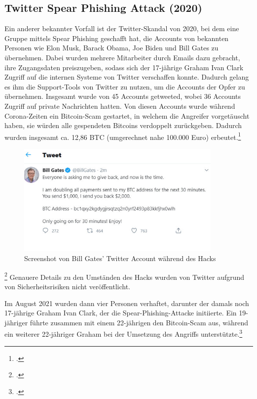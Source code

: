 \documentclass[12pt, a4paper, oneside]{scrartcl}
\begin{document}
\subsection{Twitter Spear Phishing Attack (2020)}

Ein anderer bekannter Vorfall ist der Twitter-Skandal von 2020, bei dem eine Gruppe mittels Spear Phishing geschafft
hat, die Accounts von bekannten Personen wie Elon Musk, Barack Obama, Joe Biden und Bill Gates zu übernehmen.
Dabei wurden mehrere Mitarbeiter durch Emails dazu gebracht, ihre Zugangsdaten preiszugeben, sodass sich 
der 17-jährige Graham Ivan Clark Zugriff auf die internen Systeme von Twitter verschaffen konnte. Dadurch gelang
es ihm die Support-Tools von Twitter zu nutzen, um die Accounts der Opfer zu übernehmen. Insgesamt wurde von 45 Accounts
getweeted, wobei 36 Accounts Zugriff auf private Nachrichten hatten. Von diesen Accounts wurde während Corona-Zeiten 
ein Bitcoin-Scam gestartet, in welchem die Angreifer vorgetäuscht haben, sie würden alle gespendeten Bitcoins verdoppelt
zurückgeben. Dadurch wurden insgesamt ca. 12,86 BTC (umgerechnet nahe 100.000 Euro) erbeutet.\footcite{teampw_TwitterPhishing}\\

\begin{figure}[h!]
  \centering
  \includegraphics[width=10cm]{bill_hack.png}
  \caption[Screenshot von Bill Gates' Twitter Account während des Hacks]{Screenshot von Bill Gates' Twitter Account während des Hacks\footnotemark}
\end{figure}
\footcitetext{PicTwitterHack}
Genauere Details zu den Umständen des Hacks wurden von Twitter aufgrund von Sicherheitsrisiken nicht veröffentlicht. 
\par
Im August 2021 wurden dann vier Personen verhaftet, darunter der damals noch 17-jährige Graham Ivan Clark, 
der die Spear-Phishing-Attacke initiierte. Ein 19-jähriger führte zusammen mit einem 22-jährigen den 
Bitcoin-Scam aus, während ein weiterer 22-jähriger Graham bei der Umsetzung des Angriffs unterstützte.\footcite{teampw_TwitterPhishing}\\
\end{document}
